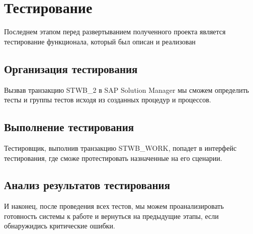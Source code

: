 \chapter{Тестирование}

Последнем этапом перед развертыванием полученного проекта
является тестирование функционала, который был описан и реализован

\section{Организация тестирования}

Вызвав транзакцию STWB\_2 в SAP Solution Manager мы сможем
определить тесты и группы тестов исходя из созданных процедур и процессов.

\clearpage
\section{Выполнение тестирования}


Тестировщик, выполнив транзакцию STWB\_WORK, попадет в интерфейс тестирования,
где сможе протестировать назначенные на его сценарии.
\clearpage


\section{Анализ результатов тестирования}
И наконец, после проведения всех тестов, мы можем проанализировать
готовность системы к работе и вернуться на предыдущие этапы, если
обнаружидись критические ошибки.
